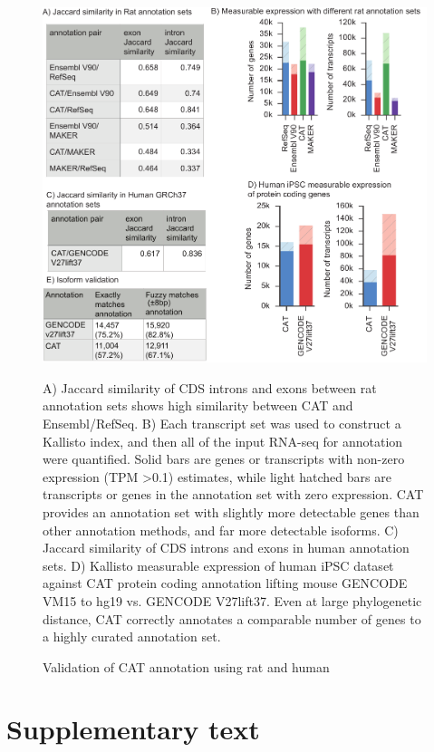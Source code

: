 \documentclass[fleqn,10pt]{wlscirep}
\newcommand{\beginsupplement}{%
        \setcounter{table}{0}
        \renewcommand{\thetable}{S\arabic{table}}%
        \setcounter{figure}{0}
        \renewcommand{\thefigure}{S\arabic{figure}}%
     }
\begin{document}
\begin{figure}
\centering
\includegraphics[width=\textwidth,height=\textheight,keepaspectratio]{figure5-rat_v15.pdf}
\caption{Validation of CAT annotation using rat and human}
A) Jaccard similarity of CDS introns and exons between rat annotation sets shows high similarity between CAT and Ensembl/RefSeq. B) Each transcript set was used to construct a Kallisto \cite{bray2015near} index, and then all of the input RNA-seq for annotation were quantified. Solid bars are genes or transcripts with non-zero expression (TPM \textgreater 0.1) estimates, while light hatched bars are transcripts or genes in the annotation set with zero expression. CAT provides an annotation set with slightly more detectable genes than other annotation methods, and far more detectable isoforms. C) Jaccard similarity of CDS introns and exons in human annotation sets. D) Kallisto measurable expression of human iPSC dataset against CAT protein coding annotation lifting mouse GENCODE VM15 to hg19 vs. GENCODE V27lift37. Even at large phylogenetic distance, CAT correctly annotates a comparable number of genes to a highly curated annotation set.
\label{fig:fig5}
\end{figure}

\clearpage
\beginsupplement

\section*{Supplementary text}
\end{document}
